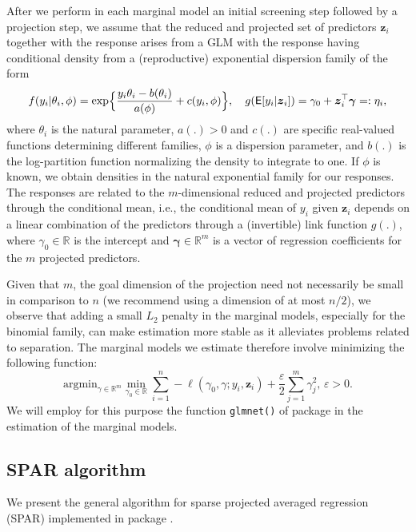 \documentclass[
  article]{jss}
\begin{document}
After we perform in each marginal model an initial screening step
followed by a projection step, we assume that the reduced and projected
set of predictors \(\boldsymbol{z}_i\) together with the response arises
from a GLM with the response having conditional density from a
(reproductive) exponential dispersion family of the form
\begin{align*}\label{eqn:y_density}
  f(y_i|\theta_i,\phi) = \exp\Bigl\{\frac{y_i\theta_i- b(\theta_i)}{a(\phi)} + c(y_i,\phi)\Bigr\},
  \quad
    g(\mathsf{E}[y_i|\boldsymbol{z}_i]) = \gamma_0 + \boldsymbol{z}_i^\top\boldsymbol{\gamma}=:\eta_i,
\end{align*} where \(\theta_i\) is the natural parameter, \(a(.)>0\) and
\(c(.)\) are specific real-valued functions determining different
families, \(\phi\) is a dispersion parameter, and \(b(.)\) is the
log-partition function normalizing the density to integrate to one. If
\(\phi\) is known, we obtain densities in the natural exponential family
for our responses. The responses are related to the \(m\)-dimensional
reduced and projected predictors through the conditional mean, i.e., the
conditional mean of \(y_i\) given \({\boldsymbol{z}}_i\) depends on a
linear combination of the predictors through a (invertible) link
function \(g(.)\), where \(\gamma_0\in\mathbb{R}\) is the intercept and
\(\boldsymbol{\gamma}\in\mathbb{R}^m\) is a vector of regression
coefficients for the \(m\) projected predictors.

Given that \(m\), the goal dimension of the projection need not
necessarily be small in comparison to \(n\) (we recommend using a
dimension of at most \(n/2\)), we observe that adding a small \(L_2\)
penalty in the marginal models, especially for the binomial family, can
make estimation more stable as it alleviates problems related to
separation. The marginal models we estimate therefore involve minimizing
the following function: \[
 \text{argmin}_{{\gamma}\in\mathbb{R}^m}\min_{\gamma_0\in\mathbb{R}}  \sum_{i=1}^n -\ell(\gamma_0, \gamma;y_i,\boldsymbol{z}_i) + \frac{\varepsilon}{2}\sum_{j=1}^m{\gamma}_j^2, \, \varepsilon > 0.
\] We will employ for this purpose the function \texttt{glmnet()} of
package  \citep{glmnet2023} in the estimation of the
marginal models.

\subsection{SPAR algorithm}\label{sec-algo}

We present the general algorithm for sparse projected averaged
regression (SPAR) implemented in package .
\end{document}
